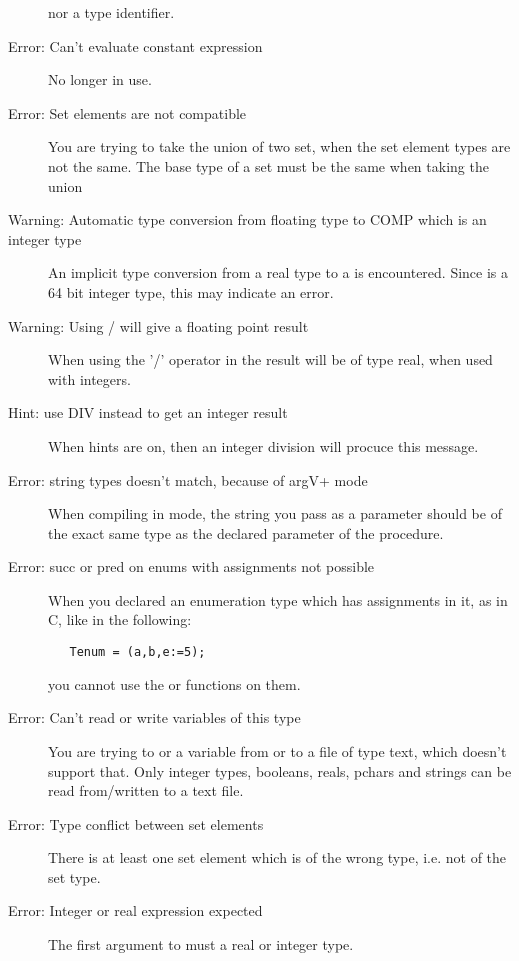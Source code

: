 \begin{description}
 nor a type identifier.
\item [Error: Can't evaluate constant expression]
 No longer in use.
\item [Error: Set elements are not compatible]
 You are trying to take the union of two set, when the set element types
 are not the same. The base type of a set must be the same when taking the
 union 
\item [Warning: Automatic type conversion from floating type to COMP which is an integer type]
 An implicit type conversion from a real type to a  is 
 encountered. Since  is a 64 bit integer type, this may indicate
 an error.
\item [Warning: Using / will give a floating point result]
 When using the '/' operator in \fpc the result will be of type real, when
 used with integers.
\item [Hint: use DIV instead to get an integer result]
 When hints are on, then an integer division will procuce this message.
\item [Error: string types doesn't match, because of argV+ mode]
 When compiling in  mode, the string you pass as a parameter
 should be of the exact same type as the declared parameter of the procedure.
\item [Error: succ or pred on enums with assignments not possible]
 When you declared an enumeration type which has assignments in it, as in C,
 like in the following:
 \begin{verbatim}
   Tenum = (a,b,e:=5);
 \end{verbatim}
 you cannot use the  or  functions on them. 
\item [Error: Can't read or write variables of this type]
 You are trying to  or  a variable from or to a 
 file of type text, which doesn't support that. Only integer types,
 booleans, reals, pchars and strings can be read from/written to a text file.
\item [Error: Type conflict between set elements]
 There is at least one set element which is of the wrong type, i.e. not of
 the set type.
\item [Error: Integer or real expression expected]
 The first argument to  must a real or integer type.
 \end{description}
